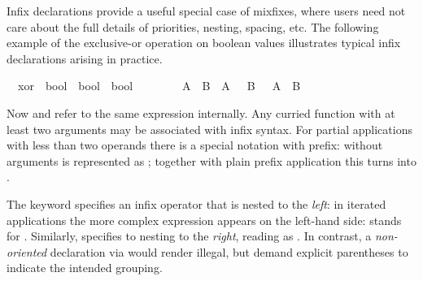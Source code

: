 \begin{isabellebody}
\begin{isamarkuptext}
  Infix declarations provide a useful special
  case of mixfixes, where users need not care about the full details
  of priorities, nesting, spacing, etc.  The following example of the
  exclusive-or operation on boolean values illustrates typical infix
  declarations arising in practice.%
\end{isamarkuptext}%
\isamarkuptrue%
\isanewline
\ \ xor\ {\isacharcolon}{\isacharcolon}\ {\isachardoublequote}bool\ {\isasymRightarrow}\ bool\ {\isasymRightarrow}\ bool{\isachardoublequote}\ \ \ \ {\isacharparenleft}\ {\isachardoublequote}{\isacharbrackleft}{\isacharplus}{\isacharbrackright}{\isachardoublequote}\ {}{}{\isacharparenright}\isanewline
\ \ {\isachardoublequote}A\ {\isacharbrackleft}{\isacharplus}{\isacharbrackright}\ B\ {\isasymequiv}\ {\isacharparenleft}A\ {\isasymand}\ {\isasymnot}\ B{\isacharparenright}\ {\isasymor}\ {\isacharparenleft}{\isasymnot}\ A\ {\isasymand}\ B{\isacharparenright}{\isachardoublequote}\isamarkupfalse%
%
\begin{isamarkuptext}%
\noindent Now  and  refer to the
  same expression internally.  Any curried function with at least two
  arguments may be associated with infix syntax.  For partial
  applications with less than two operands there is a special notation
  with  prefix:  without arguments is represented
  as ; together with plain prefix application this
  turns  into .

  \medskip The keyword  specifies an infix operator
  that is nested to the \emph{left}: in iterated applications the more
  complex expression appears on the left-hand side:  stands for .  Similarly,
   specifies to nesting to the \emph{right},
  reading  as .  In
  contrast, a \emph{non-oriented} declaration via 
  would render  illegal, but demand explicit
  parentheses to indicate the intended grouping.


\end{isamarkuptext}
\end{isabellebody}
